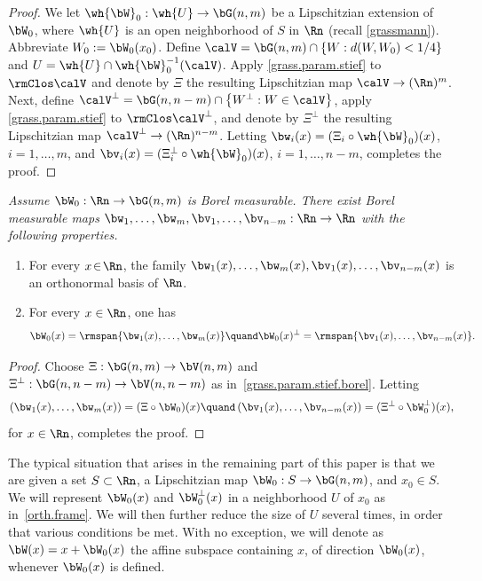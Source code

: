 \begin{proof}
We let $\wh{\bW}_0: \wh{U} \to \bG(n,m)$ be a Lipschitzian extension of $\bW_0$, where $\wh{U}$ is an open neighborhood of $S$ in $\Rn$ (recall \ref{grassmann}).
Abbreviate $W_0:= \bW_0(x_0)$.
Define $\calV = \bG(n,m) \cap \left\{ W: d(W,W_0) < 1/4 \right\}$ and $U = \wh{U} \cap \wh{\bW}_0^{-1}(\calV)$.
Apply \ref{grass.param.stief} to $\rmClos \calV$ and denote by $\Xi$ the resulting Lipschitzian map $\calV \to (\Rn)^m$.
Next, define $\calV^\perp = \bG(n,n-m) \cap \left\{ W^\perp: W \in \calV \right\}$, apply \ref{grass.param.stief} to $\rmClos \calV^\perp$, and denote by $\Xi^\perp$ the resulting Lipschitzian map $\calV^\perp \to (\Rn)^{n-m}$.
Letting $\bw_i(x) =(\Xi_i \circ \wh{\bW}_0)(x)$, $i=1,\ldots,m$, and $\bv_i(x) =(\Xi^\perp_i \circ \wh{\bW}_0)(x)$, $i=1,\ldots,n-m$, completes the proof.
\end{proof}

\begin{Empty}[]
\label{orth.frame.borel}
{\it
Assume $\bW_0: \Rn \to \bG(n,m)$ is Borel measurable. There exist Borel measurable maps $\bw_1,\ldots,\bw_m,\bv_1,\ldots,\bv_{n-m}: \Rn \to \Rn$ with the following properties.
\begin{enumerate}
\item For every $x\!\in\!\Rn$, the family $\bw_1(x),\ldots,\bw_m(x),\bv_1(x),\ldots,\bv_{n-m}(x)$ is an ortho\-normal basis of $\Rn$.
\item For every $x \in\Rn$, one has
\begin{equation*}
\bW_0(x) = \rmspan \{ \bw_1(x),\ldots,\bw_m(x) \}
\quand\bW_0(x)^\perp = \rmspan \{ \bv_1(x),\ldots,\bv_{n-m}(x) \}.
\end{equation*}
\end{enumerate}
}
\end{Empty}

\begin{proof}
Choose $\Xi: \bG(n,m) \to \bV(n,m)$ and $\Xi^\perp: \bG(n,n-m) \to \bV(n,n-m)$ as in~\ref{grass.param.stief.borel}.
Letting
\[
\left(\bw_1(x),\ldots,\bw_m(x)\right) =(\Xi \circ \bW_0)(x)\quand\left(\bv_1(x),\ldots,\bv_{n-m}(x)\right) =(\Xi^\perp \circ \bW_0^\perp)(x),
\]
for $x \in \Rn$, completes the proof.
\end{proof}

\begin{Empty}[Definition of $\bW(x)$]
\label{W}
The typical situation that arises in the remaining part of this paper is that we are given a set $S \subset \Rn$, a Lipschitzian map $\bW_0: S \to \bG(n,m)$, and $x_0 \in S$.
We will represent $\bW_0(x)$ and $\bW_0^\perp(x)$ in a neighborhood $U$ of $x_0$ as in~\ref{orth.frame}.
We will then further reduce the size of $U$ several times, in order that various conditions be met.
With no exception, we will denote as $\bW(x) = x + \bW_0(x)$ the affine subspace containing $x$, of direction $\bW_0(x)$, whenever $\bW_0(x)$ is defined.
\end{Empty}

